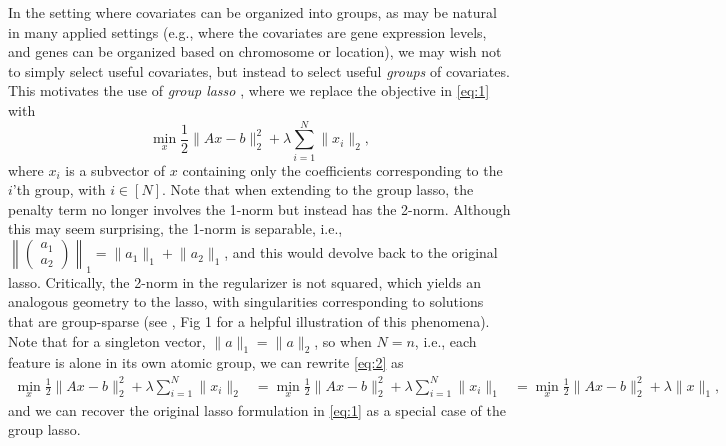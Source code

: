 \documentclass{article}
\begin{document}
In the setting where covariates can be organized into groups, as may be natural in many applied settings (e.g., where the covariates are gene expression levels, and genes can be organized based on chromosome or location), we may wish not to simply select useful covariates, but instead to select useful \emph{groups} of covariates.
This motivates the use of \emph{group lasso} \cite{yuan_model_2006}, where we replace the objective in \eqref{eq:1} with
\begin{equation}
  \label{eq:2}
  \operatorname*{min}_x \frac{1}{2} \lVert Ax - b \rVert_2^2 + \lambda \sum_{i=1}^N \lVert x_i \rVert_2,
\end{equation}
where $x_i$ is a subvector of $x$ containing only the coefficients corresponding to the $i$'th group, with $i \in [N]$.
Note that when extending to the group lasso, the penalty term no longer involves the 1-norm but instead has the 2-norm.
Although this may seem surprising, the 1-norm is separable, i.e., $\left\| \begin{pmatrix} a_1 \\ a_2 \end{pmatrix} \right\|_1 = \lVert a_1 \rVert_1 + \lVert a_2 \rVert_1$, and this would devolve back to the original lasso.
Critically, the 2-norm in the regularizer is not squared, which yields an analogous geometry to the lasso, with singularities corresponding to solutions that are group-sparse (see \cite{yuan_model_2006}, Fig 1 for a helpful illustration of this phenomena).
Note that for a singleton vector, $\lVert a \rVert_1 = \lVert a \rVert_2$, so when $N = n$, i.e., each feature is alone in its own atomic group, we can rewrite \eqref{eq:2} as
\begin{align*}
  \operatorname*{min}_x \frac{1}{2} \lVert Ax - b \rVert_2^2 + \lambda \sum_{i=1}^N \lVert x_i \rVert_2
  &= \operatorname*{min}_x \frac{1}{2}  \lVert Ax - b \rVert_2^2 + \lambda \sum_{i=1}^N \lVert x_i \rVert_1
  &= \operatorname*{min}_x \frac{1}{2} \lVert Ax - b \rVert_2^2 + \lambda  \lVert x \rVert_1    ,
\end{align*}
and we can recover the original lasso formulation in \eqref{eq:1} as a special case of the group lasso.
\end{document}
